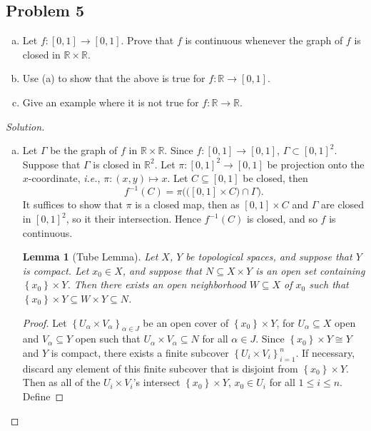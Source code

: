 \documentclass[12pt]{article}
\newcommand{\real}{\mathbb{R}}
\newcommand{\ita}[1]{\textit{#1}}
\newcommand\inv[1]{#1^{-1}}
\newcommand\setb[1]{\left \{ #1 \right \}}
\newtheorem{lemma}[theorem]{Lemma}
\theoremstyle{definition}
\begin{document}
\subsection{Problem 5 \texorpdfstring{\cite{Munkres}}{}}
\begin{enumerate}[(a)]
    \item Let $f : [0,1] \to [0,1]$. Prove that $f$ is continuous whenever the graph of $f$ is closed in $\real \times \real$.
    \item Use (a) to show that the above is true for $f : \real \to [0,1]$.
    \item Give an example where it is not true for $f : \real \to \real$.
\end{enumerate}
\begin{proof}[Solution]
    \noindent 
    \begin{enumerate}[(a)]
        \item Let $\Gamma$ be the graph of $f$ in $\real \times \real$. Since $f : [0,1] \to [0,1]$, $\Gamma \subset [0,1]^2$. Suppose that $\Gamma$ is closed in $\real^2$. Let $\pi : [0,1]^2 \to [0,1]$ be projection onto the $x$-coordinate, \ita{i.e.}, $\pi : (x,y) \mapsto x$. Let $C \subseteq [0,1]$ be closed, then 
        \[
            \inv{f}(C) = \pi \Big( \big( [0,1] \times C \big) \cap \Gamma \Big).
        \]
        It suffices to show that $\pi$ is a closed map, then as $[0,1] \times C$ and $\Gamma$ are closed in $[0,1]^2$, so it their intersection. Hence $\inv{f}(C)$ is closed, and so $f$ is continuous. 
        \begin{lemma}[Tube Lemma]
            Let $X$, $Y$ be topological spaces, and suppose that $Y$ is compact. Let $x_0 \in X$, and suppose that $N \subseteq X \times Y$ is an open set containing $\setb{ x_0 } \times Y$. Then there exists an open neighborhood $W \subseteq X$ of $x_0$ such that $\setb{ x_0 } \times Y \subseteq W \times Y \subseteq N$.
        \end{lemma}
        \begin{proof}
            Let $\setb{ U_{\alpha} \times V_{\alpha} }_{\alpha \in J}$ be an open cover of $\setb{ x_0 } \times Y$, for $U_{\alpha} \subseteq X$ open and $V_{\alpha} \subseteq Y$ open such that $U_{\alpha} \times V_{\alpha} \subseteq N$ for all $\alpha \in J$. Since $\setb{ x_0 } \times Y \cong Y$ and $Y$ is compact, there exists a finite subcover $\setb{ U_i \times V_i }_{i = 1}^n$. If necessary, discard any element of this finite subcover that is disjoint from $\setb{ x_0 } \times Y$. Then as all of the $U_i \times V_i$'s intersect $\setb{ x_0 } \times Y$, $x_0 \in U_i$ for all $1 \leq i \leq n$. Define 

\end{proof}
\end{enumerate}
\end{proof}
\end{document}
